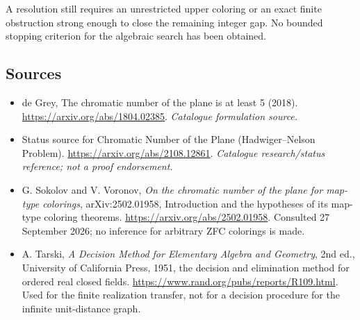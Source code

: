 \documentclass[11pt,a4paper]{article}
\numberwithin{equation}{section}
\begin{document}
A resolution still requires an unrestricted upper coloring or an exact
finite obstruction strong enough to close the remaining integer gap.
No bounded stopping criterion for the algebraic search has been obtained.
\subsection{Sources}
\begin{itemize}\raggedright
\item[\textnormal{[S1]}]\hypertarget{source:statement:1}{} de Grey, The chromatic number of the plane is at least 5 (2018).
\url{https://arxiv.org/abs/1804.02385}.
{\small\textit{Catalogue formulation source.}}
\item[\textnormal{[S2]}]\hypertarget{source:statement:2}{} Status source for Chromatic Number of the Plane (Hadwiger--Nelson Problem).
\url{https://arxiv.org/abs/2108.12861}.
{\small\textit{Catalogue research/status reference; not a proof endorsement.}}
\item[\textnormal{[E1]}]\hypertarget{extra:statement:1}{}
G. Sokolov and V. Voronov, \emph{On the chromatic number of the plane for map-type
colorings}, arXiv:2502.01958, Introduction and the hypotheses of its
map-type coloring theorems. \url{https://arxiv.org/abs/2502.01958}.
Consulted 27 September 2026; no inference for arbitrary ZFC colorings is made.
\item[\textnormal{[E2]}]\hypertarget{extra:statement:2}{}
A. Tarski, \emph{A Decision Method for Elementary Algebra and Geometry},
2nd ed., University of California Press, 1951, the decision and elimination
method for ordered real closed fields.
\url{https://www.rand.org/pubs/reports/R109.html}.
Used for the finite realization transfer, not for a decision procedure
for the infinite unit-distance graph.
\end{itemize}
\end{document}
